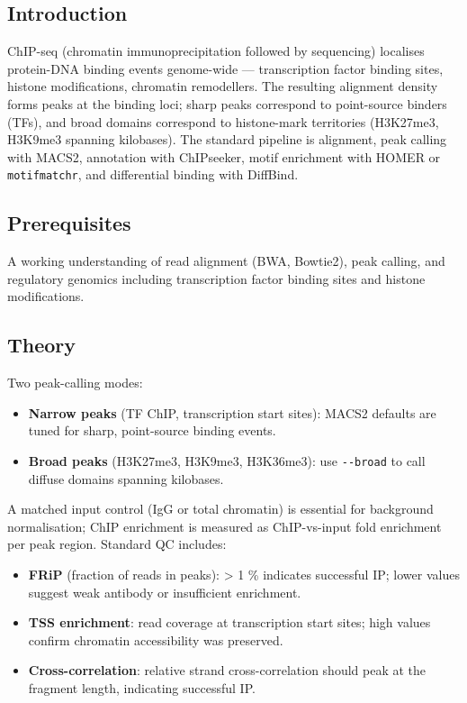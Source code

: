 \documentclass[
]{article}
\author{}
\date{\vspace{-2.5em}}
\providecommand{\tightlist}{%
  \setlength{\itemsep}{0pt}\setlength{\parskip}{0pt}}
\begin{document}
\subsection{Introduction}\label{introduction}

ChIP-seq (chromatin immunoprecipitation followed by sequencing)
localises protein-DNA binding events genome-wide --- transcription
factor binding sites, histone modifications, chromatin remodellers. The
resulting alignment density forms peaks at the binding loci; sharp peaks
correspond to point-source binders (TFs), and broad domains correspond
to histone-mark territories (H3K27me3, H3K9me3 spanning kilobases). The
standard pipeline is alignment, peak calling with MACS2, annotation with
ChIPseeker, motif enrichment with HOMER or \texttt{motifmatchr}, and
differential binding with DiffBind.

\subsection{Prerequisites}\label{prerequisites}

A working understanding of read alignment (BWA, Bowtie2), peak calling,
and regulatory genomics including transcription factor binding sites and
histone modifications.

\subsection{Theory}\label{theory}

Two peak-calling modes:

\begin{itemize}
\tightlist
\item
  \textbf{Narrow peaks} (TF ChIP, transcription start sites): MACS2
  defaults are tuned for sharp, point-source binding events.
\item
  \textbf{Broad peaks} (H3K27me3, H3K9me3, H3K36me3): use
  \texttt{-\/-broad} to call diffuse domains spanning kilobases.
\end{itemize}

A matched input control (IgG or total chromatin) is essential for
background normalisation; ChIP enrichment is measured as ChIP-vs-input
fold enrichment per peak region. Standard QC includes:

\begin{itemize}
\tightlist
\item
  \textbf{FRiP} (fraction of reads in peaks): \textgreater{} 1 \%
  indicates successful IP; lower values suggest weak antibody or
  insufficient enrichment.
\item
  \textbf{TSS enrichment}: read coverage at transcription start sites;
  high values confirm chromatin accessibility was preserved.
\item
  \textbf{Cross-correlation}: relative strand cross-correlation should
  peak at the fragment length, indicating successful IP.
\end{itemize}
\end{document}
